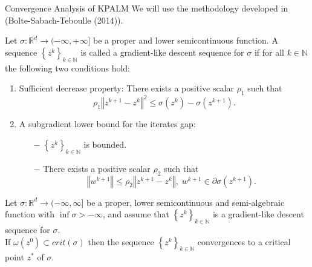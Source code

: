\documentclass[9pt,handout]{beamer} %
\newcommand{\nn}{\mathbb{N}} %
\newcommand{\rr}{\mathbb{R}} %
\newcommand{\norm}[1]{\left\Vert {#1} \right\Vert} %
\begin{document}
	\begin{frame}{Convergence Analysis of KPALM}
		We will use the methodology developed in {\dblue (Bolte-Sabach-Teboulle (2014))}.
		\begin{definition} \label{gradient_like_seq_def}
			Let $\sigma: \rr^d \rightarrow (-\infty, +\infty]$ be a proper and lower semicontinuous function. A sequence $\left\lbrace z^k \right\rbrace_{k \in \nn}$ is called a {\dblue gradient-like descent sequence} for $\sigma$ if for all $k \in \nn$ the following two conditions hold:
			\begin{enumerate}[(C1)]
				\item {\dblue Sufficient decrease property}: There exists a positive scalar $\rho_1$ such that
				\begin{equation*}
					\rho_1 \norm{z^{k+1} - z^k}^2 \leq \sigma\left( z^k \right) - \sigma \left( z^{k+1} \right) .
				\end{equation*}
				\item {\dblue A subgradient lower bound for the iterates gap}:
				\begin{itemize}
					\item[$-$] $\left\lbrace z^k \right\rbrace_{k \in \nn}$ is bounded.
					\item[$-$] There exists a positive scalar $\rho_2$ such that
					\begin{equation*}
						\norm{w^{k+1}} \leq \rho_2 \norm{z^{k+1} - z^k}, \; w^{k+1} \in \partial\sigma \left( z^{k+1}\right).
					\end{equation*}
				\end{itemize}
			\end{enumerate}
		\end{definition}
		\pause
		\begin{theorem} \label{SDP_SGP_conv_thrm}
			Let $\sigma:\rr^d \rightarrow (-\infty,\infty]$ be a proper, lower semicontinuous and semi-algebraic function with $\inf \sigma > -\infty$, and assume that $\left\lbrace z^k \right\rbrace_{k \in \nn}$ is a gradient-like descent sequence for $\sigma$. \\ If $\omega\left( z^0 \right) \subset crit(\sigma)$ then the sequence $\left\lbrace z^k \right\rbrace_{k \in \nn}$ convergences to a critical point $z^{*}$ of $\sigma$.
		\end{theorem}
	\end{frame}
	
\end{document}
